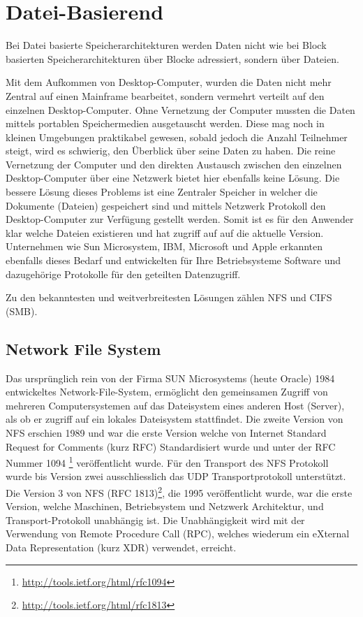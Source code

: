 \section{Datei-Basierend}
Bei Datei basierte Speicherarchitekturen werden Daten nicht wie bei Block basierten Speicherarchitekturen über Blocke adressiert, sondern über Dateien.

Mit dem Aufkommen von Desktop-Computer, wurden die Daten nicht mehr Zentral auf einen Mainframe bearbeitet, sondern vermehrt verteilt auf den einzelnen Desktop-Computer. Ohne Vernetzung der Computer mussten die Daten mittels portablen Speichermedien ausgetauscht werden. Diese mag noch in kleinen Umgebungen praktikabel gewesen, sobald jedoch die Anzahl Teilnehmer steigt, wird es schwierig, den Überblick über seine Daten zu haben. Die reine Vernetzung der Computer und den direkten Austausch zwischen den einzelnen Desktop-Computer über eine Netzwerk bietet hier ebenfalls keine Lösung. Die bessere Lösung dieses Problems ist eine Zentraler Speicher in welcher die Dokumente (Dateien) gespeichert sind und mittels Netzwerk Protokoll den Desktop-Computer zur Verfügung gestellt werden. Somit ist es für den Anwender klar welche Dateien existieren und hat zugriff auf auf die aktuelle Version. Unternehmen wie Sun Microsystem, IBM, Microsoft und Apple erkannten ebenfalls dieses Bedarf und entwickelten für Ihre Betriebsysteme Software und dazugehörige Protokolle für den geteilten Datenzugriff.

Zu den bekanntesten und weitverbreitesten Lösungen zählen NFS und \gls{CIFS} (SMB).


\subsection{Network File System}
Das ursprünglich rein von der Firma SUN Microsystems (heute Oracle) 1984 entwickeltes Network-File-System, ermöglicht den gemeinsamen Zugriff von mehreren Computersystemen auf das Dateisystem eines anderen Host (Server), als ob er zugriff auf ein lokales Dateisystem stattfindet. Die zweite Version von NFS erschien 1989 und war die erste Version welche von Internet Standard Request for Comments (kurz \gls{RFC}) Standardisiert wurde und unter der \gls{RFC} Nummer 1094 \footnote{\url{http://tools.ietf.org/html/rfc1094}} veröffentlicht wurde. Für den Transport des NFS Protokoll wurde bis Version zwei ausschliesslich das \gls{UDP} Transportprotokoll unterstützt.
Die Version 3 von NFS (\gls{RFC} 1813)\footnote{\url{http://tools.ietf.org/html/rfc1813}}, die 1995 veröffentlicht wurde, war die erste Version, welche Maschinen, Betriebsystem und Netzwerk Architektur, und Transport-Protokoll unabhängig ist. Die Unabhängigkeit wird mit der Verwendung von Remote Procedure Call (\gls{RPC}), welches wiederum ein eXternal Data Representation (kurz \gls{XDR}) verwendet, erreicht. \cite{Stern2001}

